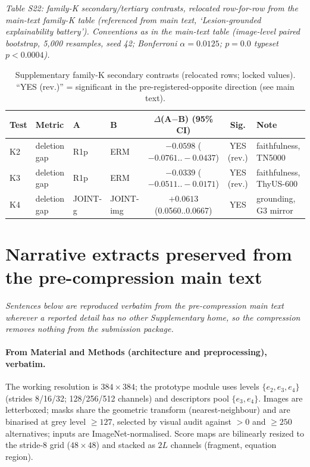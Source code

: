 \documentclass[11pt]{article}
\begin{document}
\noindent\emph{Table S22: family-K secondary/tertiary contrasts,
relocated row-for-row from the main-text family-K table (referenced
from main text, `Lesion-grounded explainability battery'). Conventions
as in the main-text table (image-level paired bootstrap, 5{,}000
resamples, seed 42; Bonferroni $\alpha{=}0.0125$; $p{=}0.0$ typeset
$p{<}0.0004$).}

\begin{table}[!ht]
\centering\scriptsize
\setlength{\tabcolsep}{3pt}
\caption{Supplementary family-K secondary contrasts (relocated rows;
locked values). ``YES (rev.)'' = significant in the
pre-registered-opposite direction (see main text).}
\label{tab:sm_familyk_sec}
\begin{tabular}{llllccl}
\toprule
Test & Metric & A & B & $\Delta$(A$-$B) (95\% CI) & Sig. & Note \\
\midrule
K2 & deletion gap       & R1p     & ERM         & $-0.0598$ ($-0.0761..-0.0437$)  & YES (rev.) & faithfulness, TN5000 \\
K3 & deletion gap       & R1p     & ERM         & $-0.0339$ ($-0.0511..-0.0171$)  & YES (rev.) & faithfulness, ThyUS-600 \\
K4 & deletion gap       & JOINT-g & JOINT-img   & $+0.0613$ (0.0560..0.0667)      & YES & grounding, G3 mirror \\
\bottomrule
\end{tabular}
\end{table}

\section{Narrative extracts preserved from the pre-compression main text}
\label{sm:extracts}

\emph{Sentences below are reproduced verbatim from the pre-compression
main text wherever a reported detail has no other Supplementary home,
so the compression removes nothing from the submission package.}
\par
\paragraph{From Material and Methods (architecture and preprocessing), verbatim.}
The working resolution is $384\times384$; the prototype module uses levels
$\{e_2, e_3, e_4\}$ (strides 8/16/32; 128/256/512 channels) and
descriptors pool $\{e_3, e_4\}$. Images are letterboxed; masks share the
geometric transform (nearest-neighbour) and are binarised at grey level
$\geq 127$, selected by visual audit against $>0$ and $\geq 250$
alternatives; inputs are ImageNet-normalised. Score maps are bilinearly
resized to the stride-8 grid ($48\times48$) and stacked as $2L$ channels
(fragment, equation region).
\end{document}
